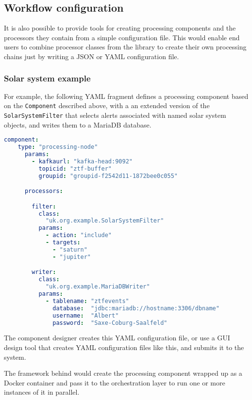 \documentclass{article}
\newcommand{\json} {JSON\xspace}
\newcommand{\yaml} {YAML\xspace}
\newcommand{\docker} {Docker\xspace}
\newcommand{\mariadb} {MariaDB\xspace}
\begin{document}
\subsection{Workflow configuration}
\label{workflow-configuration}

It is also possible to provide tools for creating processing components and the processors they contain from a simple configuration file. This would enable end users to combine processor classes from the library to create their own processing chains just by writing a \json or \yaml configuration file.

\subsubsection{Solar system example}
\label{workflow.solar-system}

For example, the following \yaml fragment defines a processing component based on the \texttt{Component} described above, with a an extended version of the \texttt{SolarSystemFilter} that selects alerts associated with named solar system objects, and writes them to a \mariadb database.

\begin{lstlisting}[language=yaml]
  component:
    type: "processing-node"
      params:
        - kafkaurl: "kafka-head:9092"
          topicid: "ztf-buffer"
          groupid: "groupid-f2542d11-1872bee0c055"

      processors:

        filter:
          class:
            "uk.org.example.SolarSystemFilter"
          params:
            - action: "include"
            - targets:
              - "saturn"
              - "jupiter"

        writer:
          class:
            "uk.org.example.MariaDBWriter"
          params:
            - tablename: "ztfevents"
              database:  "jdbc:mariadb://hostname:3306/dbname"
              username:  "Albert"
              password:  "Saxe-Coburg-Saalfeld"
\end{lstlisting}

The component designer creates this \yaml configuration file, or use a GUI design tool that creates \yaml configuration files like this, and submits it to the system.

The framework behind would create the processing component wrapped up as a \docker container and pass it to the orchestration layer to run one or more instances of it in parallel.
\end{document}
